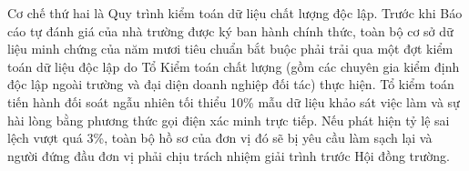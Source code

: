 Cơ chế thứ hai là Quy trình kiểm toán dữ liệu chất lượng độc lập. Trước khi Báo cáo tự đánh giá của nhà trường được ký ban hành chính thức, toàn bộ cơ sở dữ liệu minh chứng của năm mươi tiêu chuẩn bắt buộc phải trải qua một đợt kiểm toán dữ liệu độc lập do Tổ Kiểm toán chất lượng (gồm các chuyên gia kiểm định độc lập ngoài trường và đại diện doanh nghiệp đối tác) thực hiện. Tổ kiểm toán tiến hành đối soát ngẫu nhiên tối thiểu 10\% mẫu dữ liệu khảo sát việc làm và sự hài lòng bằng phương thức gọi điện xác minh trực tiếp. Nếu phát hiện tỷ lệ sai lệch vượt quá 3\%, toàn bộ hồ sơ của đơn vị đó sẽ bị yêu cầu làm sạch lại và người đứng đầu đơn vị phải chịu trách nhiệm giải trình trước Hội đồng trường.

